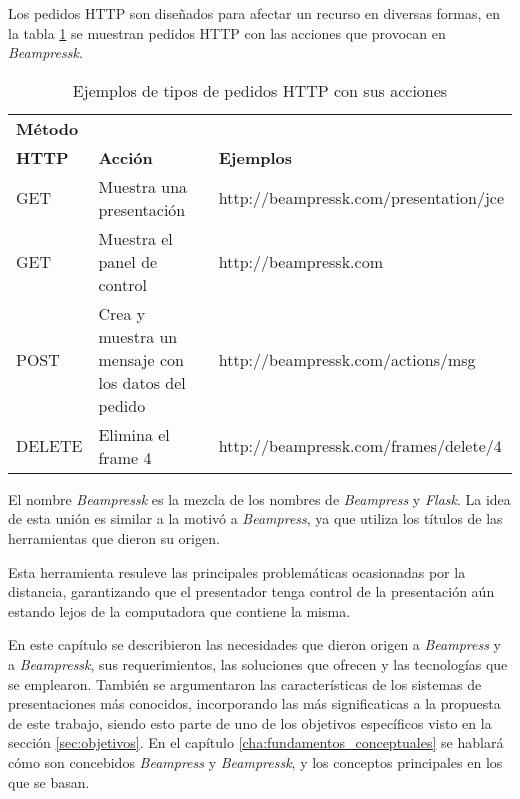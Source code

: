			Los pedidos HTTP son diseñados para afectar un recurso en diversas formas, en la tabla \ref{tab:request} se muestran pedidos HTTP con las acciones que provocan en \textit{Beampressk}.

			\begin{table}[b]
				\caption{Ejemplos de tipos de pedidos HTTP con sus acciones}
				\label{tab:request}
				\centering
			
				\begin{tabular}{| l | p{4.25cm} | p{6.75cm} |}
				\hline
			
				\hline
				\textbf{Método} & & \\ 
				\textbf{HTTP} & \textbf{Acción} & \textbf{Ejemplos} \\
				\hline
					GET & Muestra una presentación &  http://beampressk.com/presentation/jce \\ 
				\hline

				\hline
					GET & Muestra el panel de control &  http://beampressk.com \\ 
				\hline

				\hline
					POST & Crea y muestra un mensaje con los datos del pedido &  http://beampressk.com/actions/msg \\ 
				\hline

				\hline
					DELETE & Elimina el frame 4 &  http://beampressk.com/frames/delete/4 \\ 
				\hline										
			
				\hline
				\end{tabular}
			\end{table}		

		El nombre \textit{Beampressk} es la mezcla de los nombres de \textit{Beampress} y \textit{Flask}. La idea de esta unión es similar a la motivó a \textit{Beampress}, ya que utiliza los títulos de las herramientas que dieron su origen.

		Esta herramienta resuleve las principales problemáticas ocasionadas por la distancia, garantizando que el presentador tenga control de la presentación aún estando lejos de la computadora que contiene la misma.


		En este capítulo se describieron las necesidades que dieron origen a \textit{Beampress} y a \textit{Beampressk}, sus requerimientos, las soluciones que ofrecen y las tecnologías que se emplearon. También se argumentaron las características de los sistemas de presentaciones más conocidos, incorporando las más significaticas a la propuesta de este trabajo, siendo esto parte de uno de los objetivos específicos visto en la sección \ref{sec:objetivos}. En el capítulo \ref{cha:fundamentos_conceptuales} se hablará cómo son concebidos \textit{Beampress} y \textit{Beampressk}, y los conceptos principales en los que se basan.






